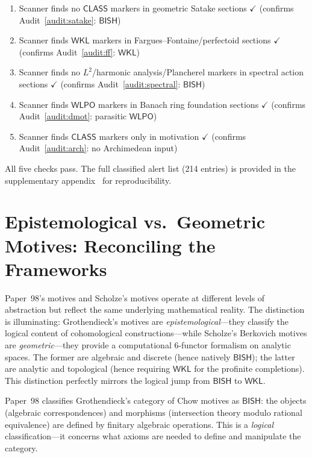 \documentclass[11pt,a4paper]{article}
\theoremstyle{plain}
\theoremstyle{definition}
\newcommand{\BISH}{\textsf{BISH}}
\newcommand{\WKL}{\textsf{WKL}}
\newcommand{\WLPO}{\textsf{WLPO}}
\newcommand{\CLASS}{\textsf{CLASS}}
\begin{document}
\begin{enumerate}[label=(\alph*)]
\item Scanner finds no $\CLASS$ markers in geometric Satake sections $\checkmark$ (confirms Audit~\ref{audit:satake}: $\BISH$)
\item Scanner finds $\WKL$ markers in Fargues--Fontaine/perfectoid sections $\checkmark$ (confirms Audit~\ref{audit:ff}: $\WKL$)
\item Scanner finds no $L^2$/harmonic analysis/Plancherel markers in spectral action sections $\checkmark$ (confirms Audit~\ref{audit:spectral}: $\BISH$)
\item Scanner finds $\WLPO$ markers in Banach ring foundation sections $\checkmark$ (confirms Audit~\ref{audit:dmot}: parasitic $\WLPO$)
\item Scanner finds $\CLASS$ markers only in motivation $\checkmark$ (confirms Audit~\ref{audit:arch}: no Archimedean input)
\end{enumerate}

All five checks pass. The full classified alert list (214 entries) is provided in the supplementary appendix~\cite{crmlint-scanner} for reproducibility.


\section{Epistemological vs.\ Geometric Motives: Reconciling the Frameworks}\label{sec:two-motives}

Paper~98's motives and Scholze's motives operate at different levels of abstraction but reflect the same underlying mathematical reality. The distinction is illuminating: Grothendieck's motives are \emph{epistemological}---they classify the logical content of cohomological constructions---while Scholze's Berkovich motives are \emph{geometric}---they provide a computational 6-functor formalism on analytic spaces. The former are algebraic and discrete (hence natively $\BISH$); the latter are analytic and topological (hence requiring $\WKL$ for the profinite completions). This distinction perfectly mirrors the logical jump from $\BISH$ to $\WKL$.

Paper~98 classifies Grothendieck's category of Chow motives as $\BISH$: the objects (algebraic correspondences) and morphisms (intersection theory modulo rational equivalence) are defined by finitary algebraic operations. This is a \emph{logical} classification---it concerns what axioms are needed to define and manipulate the category.
\end{document}
